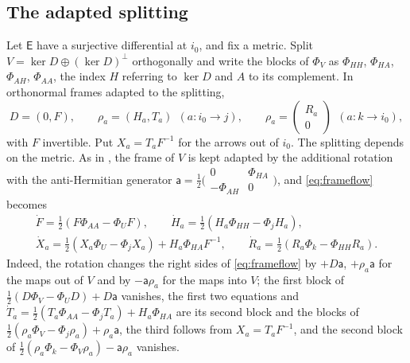 \subsection{The adapted splitting}
Let $\mathsf E$ have a surjective differential at $i_0$, and fix a metric.
Split
$V=\ker D\oplus(\ker D)^\perp$ orthogonally and write the blocks of $\Phi_V$
as $\Phi_{HH}$, $\Phi_{HA}$, $\Phi_{AH}$, $\Phi_{AA}$, the index $H$ referring
to $\ker D$ and $A$ to its complement. In orthonormal frames adapted to the
splitting,
\[
 D=(0,F),\qquad\rho_a=(H_a,T_a)\ \ (a:i_0\to j),\qquad
 \rho_a=\begin{pmatrix}R_a\\0\end{pmatrix}\ \ (a:k\to i_0),
\]
with $F$ invertible. Put $X_a=T_aF^{-1}$ for the arrows out of $i_0$. The
splitting depends on the metric. As in \cite[\S6.1]{wue26a}, the frame of $V$
is kept adapted by the additional rotation with the anti-Hermitian generator
$\mathsf a=\frac12\bigl(\begin{smallmatrix}0&\Phi_{HA}\\-\Phi_{AH}&0\end{smallmatrix}\bigr)$,
and \eqref{eq:frameflow} becomes
\begin{equation}\label{eq:adapted}
 \begin{gathered}
 \dot F=\tfrac12(F\Phi_{AA}-\Phi_UF),\qquad
 \dot H_a=\tfrac12(H_a\Phi_{HH}-\Phi_jH_a),\\
 \dot X_a=\tfrac12(X_a\Phi_U-\Phi_jX_a)+H_a\Phi_{HA}F^{-1},\qquad
 \dot R_a=\tfrac12(R_a\Phi_k-\Phi_{HH}R_a).
 \end{gathered}
\end{equation}
Indeed, the rotation changes the right sides of \eqref{eq:frameflow} by
$+D\mathsf a$, $+\rho_a\mathsf a$ for the maps out of $V$ and by
$-\mathsf a\rho_a$ for the maps into $V$; the first block of
$\frac12(D\Phi_V-\Phi_UD)+D\mathsf a$ vanishes, the first two equations and
$\dot T_a=\frac12(T_a\Phi_{AA}-\Phi_jT_a)+H_a\Phi_{HA}$ are its second block
and the blocks of $\frac12(\rho_a\Phi_V-\Phi_j\rho_a)+\rho_a\mathsf a$, the
third follows from $X_a=T_aF^{-1}$, and the second block of
$\frac12(\rho_a\Phi_k-\Phi_V\rho_a)-\mathsf a\rho_a$ vanishes.


